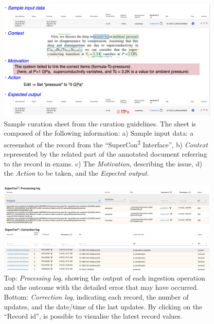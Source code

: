 \documentclass[]{interact}
\theoremstyle{plain} %
\theoremstyle{definition}
\theoremstyle{remark}
\begin{document}
\begin{figure}[ht]
  \centering
  \includegraphics[width=1\textwidth]{images/example-sheet-curation.png} 
  \caption{Sample curation sheet from the curation guidelines. The sheet is composed of the following information: a) {Sample input data}: a screenshot of the record from the ``SuperCon\textsuperscript{2} Interface'', b) \textit{Context} represented by the related part of the annotated document referring to the record in exams. c) The \textit{Motivation}, describing the issue, d) the \textit{Action} to be taken, and the \textit{Expected output}.
 }
  \label{fig:example-curation-sheet}
\end{figure}



\begin{figure}[ht]
  \centering
  \includegraphics[width=1\textwidth]{images/processing-curation-log.png} 
  \caption{Top: \textit{Processing log}, showing the output of each ingestion operation and the outcome with the detailed error that may have occurred. Bottom: \textit{Correction log}, indicating each record, the number of updates, and the date/time of the last updates. By clicking on the ``Record id'', is possible to visualise the latest record values.}
  \label{fig:processing-curation-log}
\end{figure}
\end{document}
